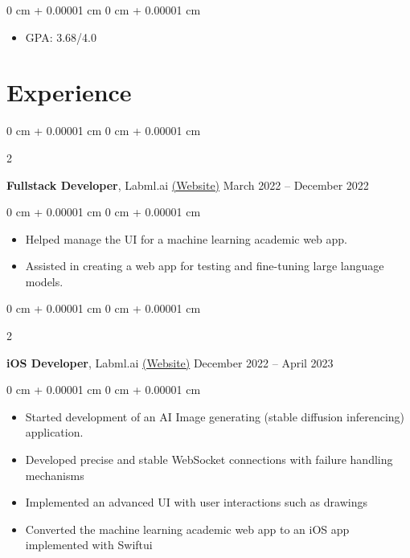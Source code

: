 \documentclass[10pt, letterpaper]{article}
\newenvironment{highlights}{
    \begin{itemize}[
        topsep=0.10 cm,
        parsep=0.10 cm,
        partopsep=0pt,
        itemsep=0pt,
        leftmargin=0 cm + 10pt
    ]
}{
    \end{itemize}
} %
\newenvironment{onecolentry}{
    \begin{adjustwidth}{
        0 cm + 0.00001 cm
    }{
        0 cm + 0.00001 cm
    }
}{
    \end{adjustwidth}
} %
\newenvironment{twocolentry}[2][]{
    \onecolentry
    \def\secondColumn{#2}
    \setcolumnwidth{\fill, 6.5 cm}
    \begin{paracol}{2}
}{
    \switchcolumn \raggedleft \secondColumn
    \end{paracol}
    \endonecolentry
} %
\let\hrefWithoutArrow\href
\begin{document}
        \vspace{0.10 cm}
        \begin{onecolentry}
            \begin{highlights}
                \item GPA: 3.68/4.0
            \end{highlights}
        \end{onecolentry}



    
    \section{Experience}



        
        \begin{twocolentry}{
            March 2022 – December 2022
        }
            \textbf{Fullstack Developer}, Labml.ai \hrefWithoutArrow{https://labml.ai/}{(Website)}\end{twocolentry}

        \begin{onecolentry}
            \begin{highlights}
                \item Helped manage the UI for a machine learning academic web app.
                \item Assisted in creating a web app for testing and fine-tuning large language models.
            \end{highlights}
        \end{onecolentry}


        \vspace{0.2 cm}

        \begin{twocolentry}{
            December 2022 – April 2023
        }
            \textbf{iOS Developer}, Labml.ai \hrefWithoutArrow{https://labml.ai/}{(Website)}\end{twocolentry}

        \vspace{0.10 cm}
        \begin{onecolentry}
            \begin{highlights}
                \item Started development of an AI Image generating (stable diffusion inferencing) application.
                \item Developed precise and stable
WebSocket connections with failure handling mechanisms
                \item Implemented an
advanced UI with user interactions such as drawings
\item Converted the machine learning academic web app to an iOS app implemented with Swiftui
            \end{highlights}
        \end{onecolentry}
\end{document}
